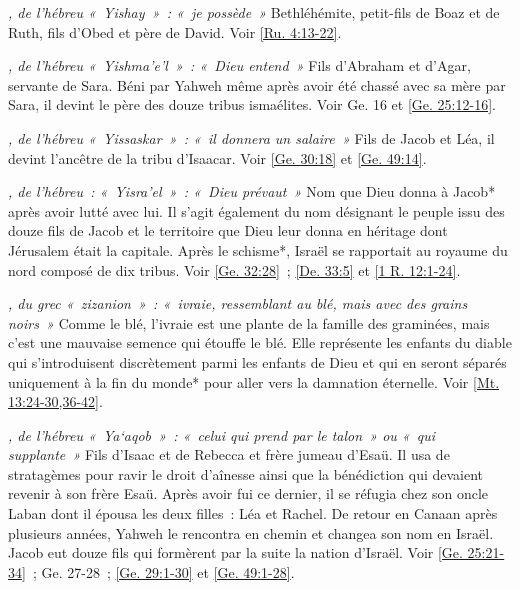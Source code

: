 \begin{multicols}{2}
\textit{, de l'hébreu «~Yishay~»~: «~je possède~»}\newline
Bethléhémite, petit-fils de Boaz et de Ruth, fils d'Obed et père de David. Voir \vref{Ru. 4:13-22}.

\textit{, de l'hébreu «~Yishma'e'l~»~: «~Dieu entend~»}\newline
Fils d'Abraham et d'Agar, servante de Sara. Béni par Yahweh même après avoir été chassé avec sa mère par Sara, il devint le père des douze tribus ismaélites.\newline
Voir Ge. 16 et \vref{Ge. 25:12-16}.

\textit{, de l'hébreu «~Yissaskar~»~: «~il donnera un salaire~»}\newline
Fils de Jacob et Léa, il devint l'ancêtre de la tribu d'Isaacar. Voir \vref{Ge. 30:18} et \vref{Ge. 49:14}.

\textit{, de l'hébreu~: «~Yisra'el~»~: «~Dieu prévaut~»}\newline
Nom que Dieu donna à Jacob* après avoir lutté avec lui. Il s'agit également du nom désignant le peuple issu des douze fils de Jacob et le territoire que Dieu leur donna en héritage dont Jérusalem était la capitale. Après le schisme*, Israël se rapportait au royaume du nord composé de dix tribus.\newline
Voir \vref{Ge. 32:28}~; \vref{De. 33:5} et \vref{1 R. 12:1-24}.

\textit{, du grec «~zizanion~»~: «~ivraie, ressemblant au blé, mais avec des grains noirs~»}\newline
Comme le blé, l'ivraie est une plante de la famille des graminées, mais c'est une mauvaise semence qui étouffe le blé. Elle représente les enfants du diable qui s'introduisent discrètement parmi les enfants de Dieu et qui en seront séparés uniquement à la fin du monde* pour aller vers la damnation éternelle. Voir \vref{Mt. 13:24-30,36-42}.

\textit{, de l'hébreu «~Ya`aqob~»~: «~celui qui prend par le talon~» ou «~qui supplante~»}\newline
Fils d'Isaac et de Rebecca et frère jumeau d'Esaü. Il usa de stratagèmes pour ravir le droit d'aînesse ainsi que la bénédiction qui devaient revenir à son frère Esaü. Après avoir fui ce dernier, il se réfugia chez son oncle Laban dont il épousa les deux filles~: Léa et Rachel. De retour en Canaan après plusieurs années, Yahweh le rencontra en chemin et changea son nom en Israël. Jacob eut douze fils qui formèrent par la suite la nation d'Israël.\newline
Voir \vref{Ge. 25:21-34}~; Ge. 27-28~; \vref{Ge. 29:1-30} et \vref{Ge. 49:1-28}.


\end{multicols}

